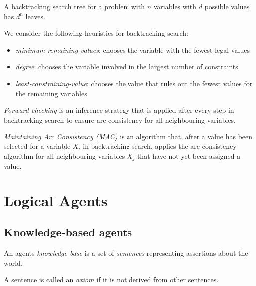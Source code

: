 \documentclass{article}
\begin{document}
\begin{lemma}
    A backtracking search tree for a problem with $n$ variables with $d$ possible values
    has $d^n$ leaves.
\end{lemma}

\begin{definition}
    We consider the following heuristics for backtracking search:
    \begin{itemize}
        \item \emph{minimum-remaining-values}: chooses the variable with the fewest legal values
        \item \emph{degree}: chooses the variable involved in the largest number of constraints
        \item \emph{least-constraining-value}: chooses the value that
        rules out the fewest values for the remaining variables
    \end{itemize}
\end{definition}

\begin{definition}[R\&N p. 217]
    \emph{Forward checking} is an inference strategy that is applied after every
    step in backtracking search to ensure arc-consistency for all neighbouring variables.
\end{definition}

\begin{definition}[R\&N p. 218]
    \emph{Maintaining Arc Consistency (MAC)} is an algorithm that, after a value has
    been selected for a variable $X_i$ in backtracking search, applies the arc
    consistency algorithm for all neighbouring variables $X_j$ that have not yet
    been assigned a value.
\end{definition}

\section{Logical Agents}

\subsection{Knowledge-based agents}

\begin{definition}[R\&N p. 235]
    An agents \emph{knowledge base} is a set of \emph{sentences} representing assertions
    about the world.

    A sentence is called an \emph{axiom} if it is not derived from other sentences.
\end{definition}
\end{document}
